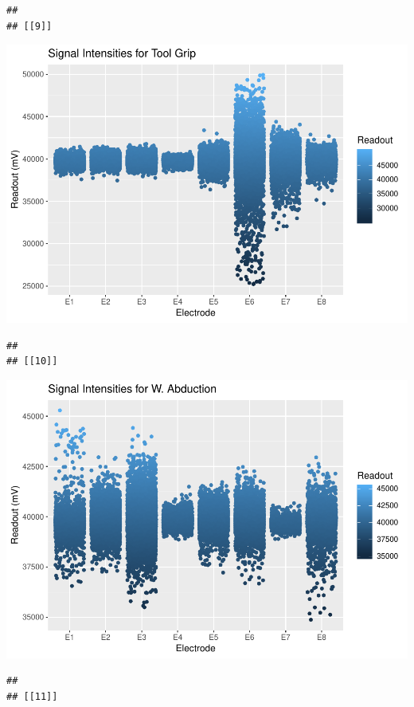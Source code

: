 \documentclass[]{article}
\begin{document}
\begin{verbatim}
## 
## [[9]]
\end{verbatim}

\includegraphics{Megahand_files/figure-latex/unnamed-chunk-5-9.pdf}

\begin{verbatim}
## 
## [[10]]
\end{verbatim}

\includegraphics{Megahand_files/figure-latex/unnamed-chunk-5-10.pdf}

\begin{verbatim}
## 
## [[11]]
\end{verbatim}
\end{document}
